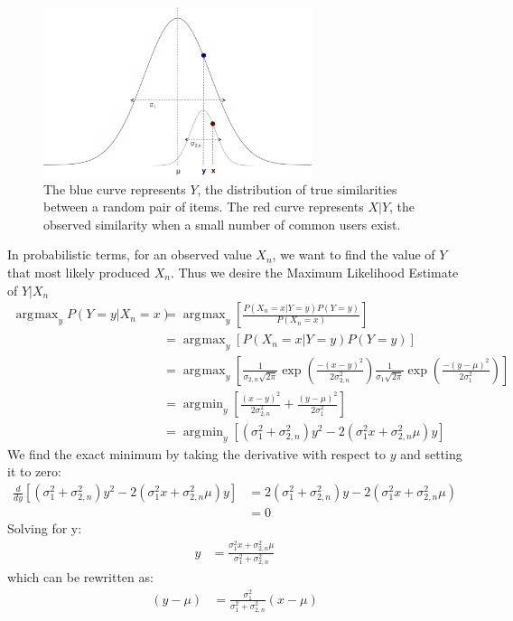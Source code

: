 \documentclass[11pt]{article}
\DeclareMathOperator*{\argmax}{arg\!\max}
\DeclareMathOperator*{\argmin}{arg\!\min}
\begin{document}
\begin{figure}[!htbp]
    \centering
    \includegraphics[width=0.7\textwidth]{twonormals.png}
	\caption{The blue curve represents $Y$, the distribution of true
    similarities between a random pair of items. The red curve represents $X|Y$,
    the observed similarity when a small number of common users exist.}
    \label{fig:two_normals}
\end{figure}

In probabilistic terms, for an observed value $X_n$, we want to find the value
of $Y$ that most likely produced $X_n$. Thus we desire the Maximum Likelihood
Estimate of $Y | X_n$
\begin{align}
\argmax_yP(Y=y|X_n=x) &= \argmax_y\left[\frac{P(X_n=x |
Y=y)P(Y=y)}{P(X_n=x)}\right]
\\&= \argmax_y\left[P(X_n=x|Y=y)P(Y=y)\right]
\\&= 
\argmax_y\left[\frac{1}{\sigma_{2,n}\sqrt{2\pi}}\exp{\left(\frac{-(x-y)^2}
{2\sigma_{2,n}^2}\right)}
\frac{1}{\sigma_{1}\sqrt{2\pi}}\exp{\left(\frac{-(y-\mu)^2}
{2\sigma_{1}^2}\right)}\right]
\\&= \argmin_y\left[\frac{(x-y)^2}{2\sigma_{2,n}^2} +
\frac{(y-\mu)^2}{2\sigma_{1}^2}\right]
\\&= \argmin_y\left[\left(\sigma_{1}^2+\sigma_{2,n}^2\right)y^2 - 
2\left(\sigma_{1}^2x+\sigma_{2,n}^2\mu\right)y\right]
\end{align}
We find the exact minimum by taking the derivative with respect to $y$ and
setting it to zero:
\begin{align}
\frac{d}{dy}\left[\left(\sigma_{1}^2+\sigma_{2,n}^2\right)y^2 - 
2\left(\sigma_{1}^2x+\sigma_{2,n}^2\mu\right)y\right]
&= 2\left(\sigma_{1}^2+\sigma_{2,n}^2\right)y - 
2\left(\sigma_{1}^2x+\sigma_{2,n}^2\mu\right) 
\\&= 0
\end{align}
Solving for y:
\begin{align}
y &= \frac{\sigma_{1}^2x+\sigma_{2,n}^2\mu}{\sigma_{1}^2+\sigma_{2,n}^2}
\end{align}
which can be rewritten as:
\begin{align}
\left(y - \mu\right) &= \frac{\sigma_{1}^2}{\sigma_{1}^2+\sigma_{2,n}^2}
\left(x-\mu\right)
\end{align}
\end{document}
